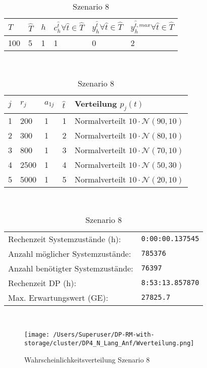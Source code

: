 \begin{table}[h!]
\renewcommand{\arraystretch}{1.5}
  \begin{center}
    \caption{Szenario 8}  \label{S8}
    \vspace*{3mm}
    \begin{tabular}{l l l l l l}   %
    $T$ & $\hat T$  & $h$ & $c_h^{\hat t}\forall \hat{t}\in{\hat T}$ & $y_h^{\hat t}\forall \hat{t}\in{\hat T}$  & $y_h^{{\hat t},max}\forall \hat{t}\in{\hat T}$  \\  \hline
100 & 5 & 1 & 1 & 0 & 2  \\ \hline
    \end{tabular} \\[3mm]
        \begin{tabular}{p{1cm} p{1cm} p{1cm}  p{1cm} p{6cm}}   %
    $j$ & $r_j$  & $a_{1j}$ & $\hat t$ & Verteilung $p_j(t)$ \\  \hline
1 & 200 & 1 & 1 & Normalverteilt $10\cdot\mathcal{N}(90, 10)$   \\
2 & 300 & 1 & 2 & Normalverteilt $10\cdot\mathcal{N}(80, 10)$  \\
3 & 800 & 1 & 3 & Normalverteilt $10\cdot\mathcal{N}(70, 10)$  \\
4 & 2500 & 1 & 4 & Normalverteilt $10\cdot\mathcal{N}(50, 30)$  \\
5 & 5000 & 1 & 5 & Normalverteilt $10\cdot\mathcal{N}(20, 10)$ \\
\hline
    \end{tabular} \\[3mm]
     \begin{tabular}{p{7cm}p{5cm}} \hline
     Rechenzeit Systemzustände (h): & \texttt{0:00:00.137545} \\
     Anzahl möglicher Systemzustände: & \texttt{785376} \\
     Anzahl benötigter Systemzustände: & \texttt{76397} \\ 
     Rechenzeit DP (h): & \texttt{8:53:13.857870} \\ 
          Max. Erwartungswert (GE): & \texttt{27825.7} \\ \hline
         \end{tabular} \\[3mm]
  \end{center}
\end{table}

\clearpage
\begin{figure}[h!]
  \begin{center}
    \texttt{[image: /Users/Superuser/DP-RM-with-storage/cluster/DP4\_N\_Lang\_Anf/Wverteilung.png]}
    \caption{Wahrscheinlichkeitsverteilung Szenario 8}  \label{SB8}
  \end{center}
\end{figure}

